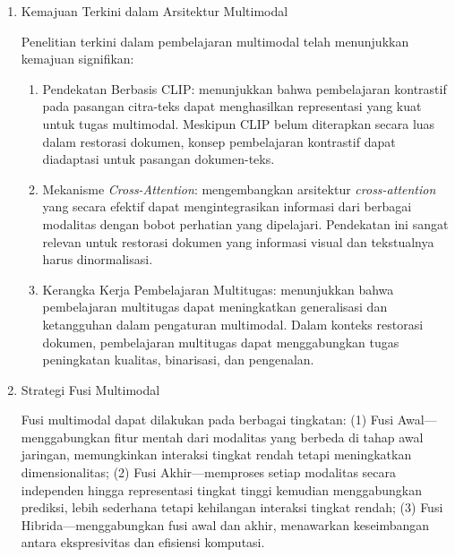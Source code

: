 \documentclass[12pt,a4paper]{article}
\begin{document}
\begin{enumerate}[leftmargin=*, labelindent=0pt, itemsep=1ex, topsep=0pt]

\item Kemajuan Terkini dalam Arsitektur Multimodal
\label{para:kemajuan-multimodal-arsitektur}

Penelitian terkini dalam pembelajaran multimodal telah menunjukkan kemajuan signifikan:

\begin{enumerate}[label=\alph*., leftmargin=1.5em, labelsep=0.5em, itemindent=0pt, noitemsep, topsep=0pt]
  \item Pendekatan Berbasis CLIP: \parencite{radford2021} menunjukkan bahwa pembelajaran kontrastif pada pasangan citra-teks dapat menghasilkan representasi yang kuat untuk tugas multimodal. Meskipun CLIP belum diterapkan secara luas dalam restorasi dokumen, konsep pembelajaran kontrastif dapat diadaptasi untuk pasangan dokumen-teks.

  \item Mekanisme \textit{Cross-Attention}: \parencite{vaswani2017} mengembangkan arsitektur \textit{cross-attention} yang secara efektif dapat mengintegrasikan informasi dari berbagai modalitas dengan bobot perhatian yang dipelajari. Pendekatan ini sangat relevan untuk restorasi dokumen yang informasi visual dan tekstualnya harus dinormalisasi.

  \item Kerangka Kerja Pembelajaran Multitugas: \parencite{raffel2020} menunjukkan bahwa pembelajaran multitugas dapat meningkatkan generalisasi dan ketangguhan dalam pengaturan multimodal. Dalam konteks restorasi dokumen, pembelajaran multitugas dapat menggabungkan tugas peningkatan kualitas, binarisasi, dan pengenalan.
\end{enumerate}

\item Strategi Fusi Multimodal
\label{para:strategi-fusi}

Fusi multimodal dapat dilakukan pada berbagai tingkatan: (1) Fusi Awal---menggabungkan fitur mentah dari modalitas yang berbeda di tahap awal jaringan, memungkinkan interaksi tingkat rendah tetapi meningkatkan dimensionalitas; (2) Fusi Akhir---memproses setiap modalitas secara independen hingga representasi tingkat tinggi kemudian menggabungkan prediksi, lebih sederhana tetapi kehilangan interaksi tingkat rendah; (3) Fusi Hibrida---menggabungkan fusi awal dan akhir, menawarkan keseimbangan antara ekspresivitas dan efisiensi komputasi.

\end{enumerate}
\end{document}
